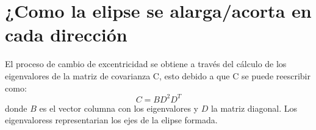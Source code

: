 \section{¿Como la elipse se alarga/acorta en cada dirección}
El proceso de cambio de excentricidad se obtiene a través del cálculo de los eigenvalores de la matriz de covarianza C, esto debido a que C se puede reescribir como:
\begin{equation}
    C=BD^2D^T \label{eq:Cdefinicion}
\end{equation}
donde $B$ es el vector columna con los eigenvalores y $D$ la matriz diagonal. Los eigenvaloress representarian los ejes de la elipse formada.\cite{mei2021covariance}
